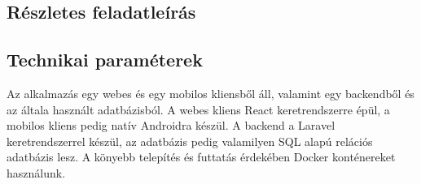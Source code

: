 \subsection{Részletes feladatleírás}


\subsection{Technikai paraméterek}

Az alkalmazás egy webes és egy mobilos kliensből áll, valamint egy backendből és az általa használt adatbázisból. A webes kliens  React keretrendszerre épül, a mobilos kliens pedig natív Androidra készül. A backend a Laravel keretrendszerrel készül, az adatbázis pedig valamilyen SQL alapú relációs adatbázis lesz. A könyebb telepítés és futtatás érdekében Docker konténereket használunk.